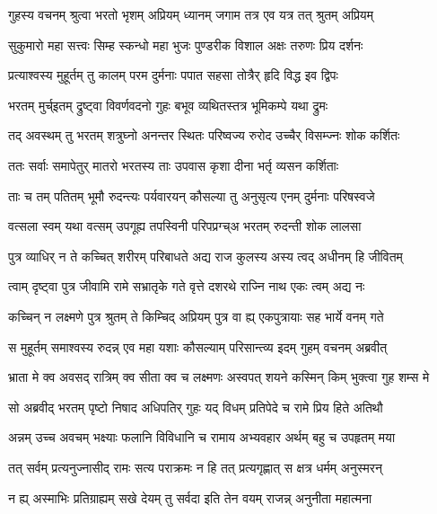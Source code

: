 
\twolineshloka
{गुहस्य वचनम् श्रुत्वा भरतो भृशम् अप्रियम्}
{ध्यानम् जगाम तत्र एव यत्र तत् श्रुतम् अप्रियम्} %

\twolineshloka
{सुकुमारो महा सत्त्वः सिम्ह स्कन्धो महा भुजः}
{पुण्डरीक विशाल अक्षः तरुणः प्रिय दर्शनः} %

\twolineshloka
{प्रत्याश्वस्य मुहूर्तम् तु कालम् परम दुर्मनाः}
{पपात सहसा तोत्रैर् हृदि विद्ध इव द्विपः} %

\twolineshloka
{भरतम् मुर्च्इतम् द्रुष्ट्वा विवर्णवदनो गुहः}
{बभूव व्यथितस्तत्र भूमिकम्पे यथा द्रुमः} %

\twolineshloka
{तद् अवस्थम् तु भरतम् शत्रुघ्नो अनन्तर स्थितः}
{परिष्वज्य रुरोद उच्चैर् विसम्ज्नः शोक कर्शितः} %

\twolineshloka
{ततः सर्वाः समापेतुर् मातरो भरतस्य ताः}
{उपवास कृशा दीना भर्तृ व्यसन कर्शिताः} %

\twolineshloka
{ताः च तम् पतितम् भूमौ रुदन्त्यः पर्यवारयन्}
{कौसल्या तु अनुसृत्य एनम् दुर्मनाः परिषस्वजे} %

\twolineshloka
{वत्सला स्वम् यथा वत्सम् उपगूह्य तपस्विनी}
{परिपप्रग्च्अ भरतम् रुदन्ती शोक लालसा} %

\twolineshloka
{पुत्र व्याधिर् न ते कच्चित् शरीरम् परिबाधते}
{अद्य राज कुलस्य अस्य त्वद् अधीनम् हि जीवितम्} %

\twolineshloka
{त्वाम् दृष्ट्वा पुत्र जीवामि रामे सभ्रातृके गते}
{वृत्ते दशरथे राज्नि नाथ एकः त्वम् अद्य नः} %

\twolineshloka
{कच्चिन् न लक्ष्मणे पुत्र श्रुतम् ते किम्चिद् अप्रियम्}
{पुत्र वा ह्य् एकपुत्रायाः सह भार्ये वनम् गते} %

\twolineshloka
{स मुहूर्तम् समाश्वस्य रुदन्न् एव महा यशाः}
{कौसल्याम् परिसान्त्व्य इदम् गुहम् वचनम् अब्रवीत्} %

\twolineshloka
{भ्राता मे क्व अवसद् रात्रिम् क्व सीता क्व च लक्ष्मणः}
{अस्वपत् शयने कस्मिन् किम् भुक्त्वा गुह शम्स मे} %

\twolineshloka
{सो अब्रवीद् भरतम् पृष्टो निषाद अधिपतिर् गुहः}
{यद् विधम् प्रतिपेदे च रामे प्रिय हिते अतिथौ} %

\twolineshloka
{अन्नम् उच्च अवचम् भक्ष्याः फलानि विविधानि च}
{रामाय अभ्यवहार अर्थम् बहु च उपहृतम् मया} %

\twolineshloka
{तत् सर्वम् प्रत्यनुज्नासीद् रामः सत्य पराक्रमः}
{न हि तत् प्रत्यगृह्णात् स क्षत्र धर्मम् अनुस्मरन्} %

\twolineshloka
{न ह्य् अस्माभिः प्रतिग्राह्यम् सखे देयम् तु सर्वदा}
{इति तेन वयम् राजन्न् अनुनीता महात्मना} %

